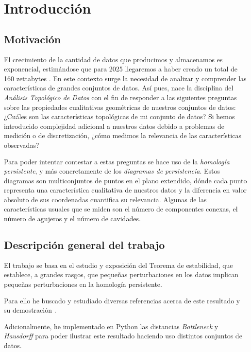 \chapter{Introducción}

\section{Motivación}
El crecimiento de la cantidad de datos que producimos y almacenamos es exponencial, estimándose que para 2025 llegaremos a haber creado un total de 160 zettabytes \cite{datos2025}. En este contexto surge la necesidad de analizar y comprender las características de grandes conjuntos de datos. Así pues, nace la disciplina del \emph{Análisis Topológico de Datos} con el fin de responder a las siguientes preguntas sobre las propiedades cualitativas geométricas de nuestros conjuntos de datos: ¿Cuáles son las características topológicas de mi conjunto de datos? Si hemos introducido complejidad adicional a nuestros datos debido a problemas de medición o de discretización, ¿cómo medimos la relevancia de las características observadas?

Para poder intentar contestar a estas preguntas se hace uso de la \emph{homología persistente}, y más concretamente de los \emph{diagramas de persistencia}. Estos diagramas son multiconjuntos de puntos en el plano extendido, dónde cada punto representa una característica cualitativa de nuestros datos y la diferencia en valor absoluto de sus coordenadas cuantifica su relevancia. Algunas de las características usuales que se miden son el número de componentes conexas, el número de agujeros y el número de cavidades.

\section{Descripción general del trabajo}
El trabajo se basa en el estudio y exposición del Teorema de estabilidad, que establece, a grandes rasgos, que pequeñas perturbaciones en los datos implican pequeñas perturbaciones en la homología persistente.

Para ello he buscado y estudiado diversas referencias acerca de este resultado y su demostración \cite{libroEH, articuloPersistenciaEH, Cohen-Steiner2007}.

Adicionalmente, he implementado en Python las distancias \emph{Bottleneck} y \emph{Hausdorff} para poder ilustrar este resultado haciendo uso distintos conjuntos de datos. 

